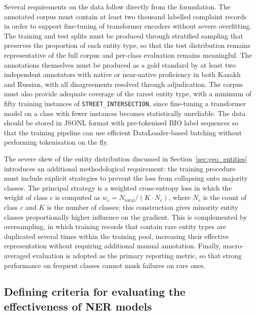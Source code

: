 Several requirements on the data follow directly from the formulation. The annotated corpus must contain at least two thousand labelled complaint records in order to support fine-tuning of transformer encoders without severe overfitting. The training and test splits must be produced through stratified sampling that preserves the proportion of each entity type, so that the test distribution remains representative of the full corpus and per-class evaluation remains meaningful. The annotations themselves must be produced as a gold standard by at least two independent annotators with native or near-native proficiency in both Kazakh and Russian, with all disagreements resolved through adjudication. The corpus must also provide adequate coverage of the rarest entity type, with a minimum of fifty training instances of \texttt{STREET\_INTERSECTION}, since fine-tuning a transformer model on a class with fewer instances becomes statistically unreliable. The data should be stored in JSONL format with pre-tokenised BIO label sequences so that the training pipeline can use efficient DataLoader-based batching without performing tokenisation on the fly.

The severe skew of the entity distribution discussed in Section~\ref{sec:geo_entities} introduces an additional methodological requirement: the training procedure must include explicit strategies to prevent the loss from collapsing onto majority classes. The principal strategy is a weighted cross-entropy loss in which the weight of class $c$ is computed as $w_c = N_{\text{total}} / (K \cdot N_c)$, where $N_c$ is the count of class $c$ and $K$ is the number of classes; this construction gives minority entity classes proportionally higher influence on the gradient. This is complemented by oversampling, in which training records that contain rare entity types are duplicated several times within the training pool, increasing their effective representation without requiring additional manual annotation. Finally, macro-averaged evaluation is adopted as the primary reporting metric, so that strong performance on frequent classes cannot mask failures on rare ones.

\subsection{Defining criteria for evaluating the effectiveness of NER models}
\label{sec:eval_criteria}

